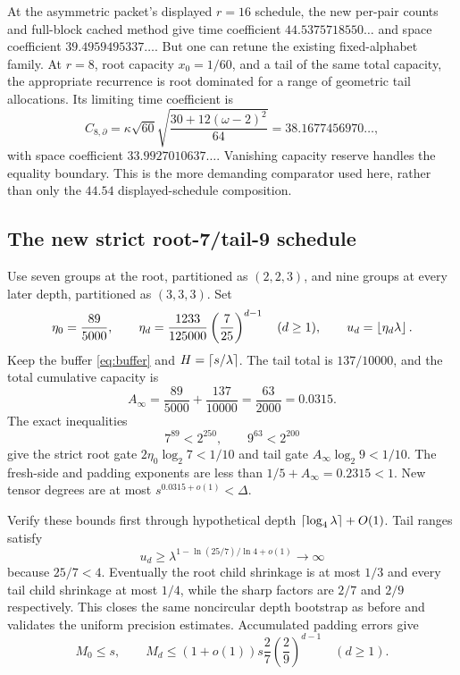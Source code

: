 At the asymmetric packet's displayed $r=16$ schedule, the new per-pair
counts and full-block cached method give time coefficient
$44.5375718550\ldots$ and space coefficient $39.4959495337\ldots$.
But one can retune the existing fixed-alphabet family. At $r=8$, root
capacity $x_0=1/60$, and a tail of the same total capacity, the appropriate
recurrence is root dominated for a range of geometric tail allocations.
Its limiting time coefficient is
\begin{equation}\label{eq:r8-baseline}
 C_{8,\partial}=\kappa\sqrt{60}
  \sqrt{\frac{30+12(\omega-2)^2}{64}}
  =38.1677456970\ldots,
\end{equation}
with space coefficient $33.9927010637\ldots$. Vanishing capacity reserve
handles the equality boundary. This is the more demanding comparator
used here, rather than only the $44.54$ displayed-schedule composition.

\subsection{The new strict root-7/tail-9 schedule}

Use seven groups at the root, partitioned as $(2,2,3)$, and nine groups
at every later depth, partitioned as $(3,3,3)$. Set
\begin{equation}\label{eq:new-cache-schedule}
 \eta_0=\frac{89}{5000},\qquad
 \eta_d=\frac{1233}{125000}\left(\frac7{25}\right)^{d-1}\quad(d\ge1),
 \qquad u_d=\left\lfloor\eta_d\lambda\right\rfloor.
\end{equation}
Keep the buffer \eqref{eq:buffer} and $H=\left\lceil s/\lambda\right\rceil$.
The tail total is $137/10000$, and the total cumulative capacity is
\[
 A_\infty=\frac{89}{5000}+\frac{137}{10000}
 =\frac{63}{2000}=0.0315.
\]
The exact inequalities
\begin{equation}\label{eq:cache-gates}
 7^{89}<2^{250},\qquad 9^{63}<2^{200}
\end{equation}
give the strict root gate $2\eta_0\log_2 7<1/10$ and tail gate
$A_\infty\log_2 9<1/10$. The fresh-side and padding exponents are
less than $1/5+A_\infty=0.2315<1$. New tensor degrees are at most
$s^{0.0315+o(1)}<\Delta$.

Verify these bounds first through hypothetical depth
$\left\lceil\log_4\lambda\right\rceil+O(1)$. Tail ranges satisfy
\[
 u_d\ge\lambda^{1-\ln(25/7)/\ln4+o(1)}\longrightarrow\infty
\]
because $25/7<4$. Eventually the root child shrinkage is at most $1/3$
and every tail child shrinkage at most $1/4$, while the sharp factors
are $2/7$ and $2/9$ respectively. This closes the same noncircular
depth bootstrap as before and validates the uniform precision estimates.
Accumulated padding errors give
\[
 M_0\le s,\qquad
 M_d\le(1+o(1))s\frac27\left(\frac29\right)^{d-1}\quad(d\ge1).
\]

